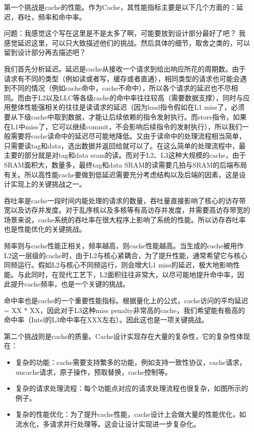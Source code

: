 第一个挑战是cache的性能。作为Cache，其性能指标主要是以下几个方面的：延迟，吞吐，频率和命中率。

问题：我感觉这个写在这里是不是太多了啊，可能要放到设计部分最好了吧？
我感觉延迟这里，可以只大致描述他们的挑战。然后具体的细节，取舍之类的，可以留到设计部分再去描述吧？

我们首先分析延迟。延迟是cache从接收一个请求到给出响应所花的周期数。由于请求有不同的类型（例如读或者写，缓存或者直通），相同类型的请求也可能会遇到不同的情况（例如cache命中，cache不命中），所以各个请求的延迟也不尽相同。而由于L2以及LLC等各级cache的命中率往往较高（需要数据支撑），同时与应用整体性能强相关的往往是读请求的延迟（因为load指令假如在L1 miss了，必须要从下级cache中取到数据，才能让后续依赖的指令发射执行。而store指令，如果在L1中miss了，它可以继续commit，不会影响后续指令的发射执行），所以我们一般需要将cache读命中的延迟尽可能地降低。又由于读命中的处理流程相当简单，只需要读tag和data，选出数据并返回给就可以了。在这么简单的处理流程中，最主要的部分就是对tag和data sram的读。而对于L2、L3这种大规模的cache，由于SRAM面积大，数量多，最终tag和data SRAM的读需要几拍与SRAM的后端布局有关。所以高性能cache要做到低延迟需要充分考虑结构以及后端的因素，这是设计实现上的关键挑战之一。

吞吐率是cache一段时间内能处理的请求的数量，吞吐量直接影响了核心的访存带宽以及访存并发度。对于乱序核以及多核等有高访存并发度，并需要高访存带宽的场景来说，cache系统的吞吐率在很大程序上影响了系统的性能。所以访存吞吐率也是性能优化的关键挑战。

频率则与cache性能正相关，频率越高，则cache性能越高。当生成的cache被用作L2这一层级的cache时，由于L2与核心紧耦合，为了提升性能，通常希望它与核心同频运行。假如L2与核心不同频运行，则会增大L1 miss的延迟，极大地影响性能。与此同时，在现代工艺下，L2面积往往非常大，以尽可能地提升命中率，因此提升cache频率，也是一个关键的挑战。

命中率也是cache的一个重要性能指标。根据量化上的公式，cache访问的平均延迟 = XX * XX，因此对于L3这种miss penalty非常高的cache，我们希望能有极高的命中率（Intel的L3命中率在XXX左右）。因此这也是一项关键挑战。

第二个挑战则是cache的质量。Cache设计实现存在大量的复杂性，它的复杂性体现在：

\begin{itemize}
	\item 复杂的功能：cache需要支持繁多的功能，例如支持一致性协议，cache请求，uncache请求，原子操作，预取替换，cache控制等。
	\item 复杂的请求处理流程：每个功能点对应的请求处理流程也很复杂，如图所示的例子。
	\item 复杂的性能优化：为了提升cache性能，cache设计上会做大量的性能优化，如流水化，多请求并行处理等。这会让设计实现进一步复杂化。
\end{itemize}

